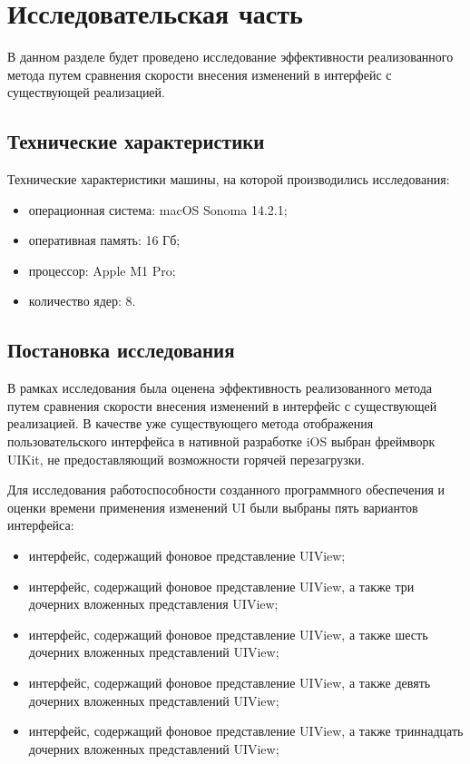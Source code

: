 \section{Исследовательская часть}

В данном разделе будет проведено исследование эффективности реализованного метода путем сравнения скорости внесения изменений в интерфейс с существующей реализацией.

\subsection{Технические характеристики}

Технические характеристики машины, на которой производились исследования:
\begin{itemize}[label=---]
	\item операционная система: macOS Sonoma 14.2.1;
	\item оперативная память: 16 Гб;
	\item процессор: Apple M1 Pro;
	 \item количество ядер: 8.
\end{itemize}

\subsection{Постановка исследования}

В рамках исследования была оценена эффективность реализованного метода путем сравнения скорости внесения изменений в интерфейс с существующей реализацией.
В качестве уже существующего метода отображения пользовательского интерфейса в нативной разработке iOS выбран фреймворк UIKit, не предоставляющий возможности горячей перезагрузки.

Для исследования работоспособности созданного программного обеспечения и оценки времени применения изменений UI были выбраны пять вариантов интерфейса:
\begin{itemize}[label=---]
	\item интерфейс, содержащий фоновое представление UIView;
	\item интерфейс, содержащий фоновое представление UIView, а также три дочерних вложенных представления UIView;
	\item интерфейс, содержащий фоновое представление UIView, а также шесть дочерних вложенных представлений UIView;
	\item интерфейс, содержащий фоновое представление UIView, а также девять дочерних вложенных представлений UIView;
	\item интерфейс, содержащий фоновое представление UIView, а также триннадцать дочерних вложенных представлений UIView;
\end{itemize}	

